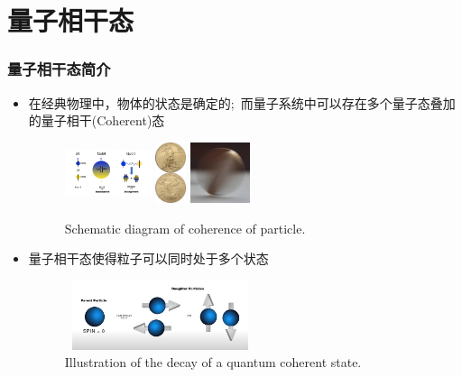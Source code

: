 \section{量子相干态}
\begin{frame}
    \frametitle{量子相干态简介}
    \begin{itemize}
	    \item 在经典物理中，物体的状态是确定的;~而量子系统中可以存在多个量子态叠加的量子相干\textrm{(Coherent)}态
            \begin{figure}
        \centering
                \includegraphics[height=0.7in, width=1.0in, viewport=0 0 460 330,clip]{Figures/Illustration-of-a-bit_and_qubit.png}
		\hspace{0.1in}
                \includegraphics[height=0.7in, width=0.35in, viewport=0 0 85 170,clip]{Figures/American_Eagle_gold_coin_2019_2.jpg}
                \includegraphics[height=0.7in, width=0.7in, viewport=0 0 150 151,clip]{Figures/Coin-spin.jpg}
		\caption{\tiny{\textrm{Schematic diagram of coherence of particle.}}}
		\label{Fig:Schematic-Coherence-of-particle}
            \end{figure}
	    \vskip -0.24in
	    {\fontsize{8.5pt}{5.2pt}\selectfont{\textcolor{magenta}{叠加态之间存在确定的相位关系}}}
        \item 量子相干态使得粒子可以同时处于多个状态
            \begin{figure}
        \centering
                \includegraphics[height=0.8in, width=2.2in, viewport=0 0 720 283,clip]{Figures/Schematic-Coherence-of-particle.jpeg}
		\caption{\tiny{\textrm{Illustration of the decay of a quantum coherent state.}}}
		\label{Fig:Illustration-of-a-bit_and_qubit}
            \end{figure}
    \end{itemize}
\end{frame}

